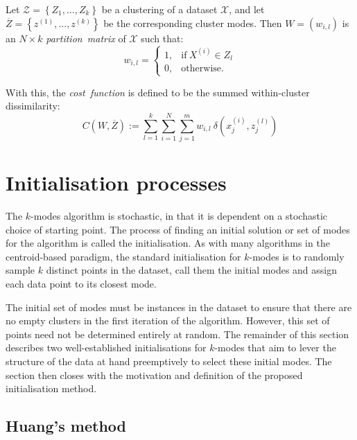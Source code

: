 \begin{definition}\label{def:cost}
    Let \(\mathcal{Z} = \left\{Z_1, \ldots, Z_k\right\}\) be a clustering of a
    dataset \(\mathcal{X}\), and let \(\overline Z = \left\{z^{(1)},
    \ldots, z^{(k)}\right\}\) be the corresponding cluster modes. Then \(W =
    \left(w_{i, l}\right)\) is an \(N \times k\) \emph{partition~matrix} of
    \(\mathcal{X}\) such that:
    \[
        w_{i, l} = \begin{cases}
                     1, & \text{if} \ X^{(i)} \in Z_l\\
                     0, & \text{otherwise.}
                   \end{cases}
    \]

    With this, the \emph{cost~function} is defined to be the summed
    within-cluster dissimilarity:
    \begin{equation}\label{eq:cost}
        C\left(W, \overline Z\right) := \sum_{l=1}^{k} \sum_{i=1}^{N}
        \sum_{j=1}^{m} w_{i,l} \ \delta\left(x_j^{(i)}, z_j^{(l)}\right)
    \end{equation}
\end{definition}



\section{Initialisation processes}\label{sec:inits}

The \(k\)-modes algorithm is stochastic, in that it is dependent on a stochastic
choice of starting point. The process of finding an initial solution or set of
modes for the algorithm is called the initialisation. As with many algorithms in
the centroid-based paradigm, the standard initialisation for \(k\)-modes is to
randomly sample \(k\) distinct points in the dataset, call them the initial
modes and assign each data point to its closest mode.

The initial set of modes must be instances in the dataset to ensure that there
are no empty clusters in the first iteration of the algorithm. However, this set
of points need not be determined entirely at random. The remainder of this
section describes two well-established initialisations for \(k\)-modes that aim
to lever the structure of the data at hand preemptively to select these initial
modes. The section then closes with the motivation and definition of the
proposed initialisation method.

\subsection{Huang's method}\label{subsec:huang}

